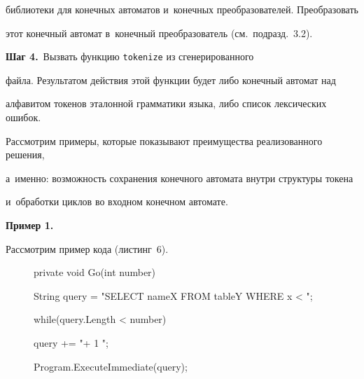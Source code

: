 биб\-лио\-те\-ки для конечных автоматов и~конечных преобразователей. Преобразовать 


этот конечный автомат в~конечный преобразователь (см.\ подразд.~3.2).





\textbf{{Шаг 4.}}\  Вызвать функцию \verb"tokenize" из сгенерированного 


файла. Результатом действия этой функции будет либо конечный автомат над 


алфавитом токенов эталонной грамматики языка, либо список лексических ошибок.





Рассмотрим примеры, которые показывают преимущества реализованного решения, 


а~именно: возможность сохранения конечного автомата внутри структуры токена 


и~обработки циклов во входном конечном автомате.





\textbf{{Пример 1.}}


Рассмотрим пример кода (листинг~6).





\renewcommand{\figurename}{\protect\bf Листинг}


\setcounter{figure}{5}








\begin{figure} %


\begin{center}


\begin{boxedverbatim}


private void Go(int number){


   String query =  "SELECT nameX FROM tableY WHERE x < ";


   while(query.Length < number){


      query += "+ 1 ";


   }


   Program.ExecuteImmediate(query);


}


\end{boxedverbatim}


\end{center}





\vspace*{-6pt}




\vspace*{-3pt}


\end{figure}





